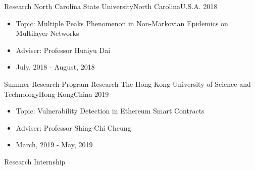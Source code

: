%
%
%
\begin{experiences}
  \experience
  {Research}   {North Carolina State University}{North Carolina}{U.S.A.}
  {2018} {
    \begin{itemize}
      \item Topic: Multiple Peaks Phenomenon in Non-Markovian Epidemics on Multilayer Networks
      \item Adviser: Professor Huaiyu Dai
      \item July, 2018 - August, 2018
    \end{itemize}
  }
  {Summer Research Program}
  \emptySeparator
  \experience
  {Research} {The Hong Kong University of Science and Technology}{Hong Kong}{China}
  {2019}    {
    \begin{itemize}
      \item Topic: Vulnerability Detection in Ethereum Smart Contracts
      \item Adviser: Professor Shing-Chi Cheung
      \item March, 2019 - May, 2019
    \end{itemize}
  }
  {Research Internship}
\end{experiences}
